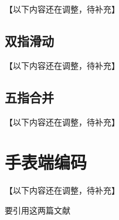 【以下内容还在调整，待补充】

\subsection{双指滑动}

【以下内容还在调整，待补充】

\subsection{五指合并}

【以下内容还在调整，待补充】

\section{手表端编码}

【以下内容还在调整，待补充】

要引用\cite{swift2015, swiftoc2015}这两篇文献
